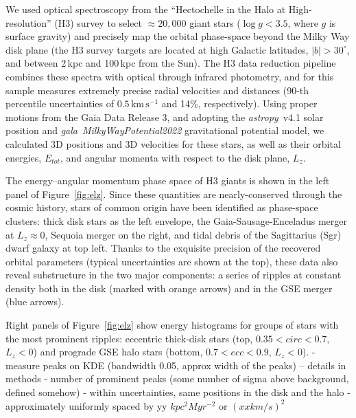 \documentclass{natureprintstyle}
\newcommand{\kms}{\ensuremath{\textrm{km}\,\textrm{s}^{-1}}}
\newcommand{\package}[1]{\textsl{#1}}
\begin{document}
We used optical spectroscopy from the ``Hectochelle in the Halo at High-resolution'' (H3) survey\cite{conroy:2019} to select $\approx20,000$ giant stars ($\log g<3.5$, where $g$ is surface gravity) and precisely map the orbital phase-space beyond the Milky Way disk plane (the H3 survey targets are located at high Galactic latitudes, $|b|>30^\circ$, and between 2\,kpc and 100\,kpc from the Sun).
The H3 data reduction pipeline\cite{cargile:2020} combines these spectra with optical through infrared photometry, and for this sample measures extremely precise radial velocities and distances (90-th percentile uncertainties of $0.5\,\kms$ and 14\%, respectively).
Using proper motions from the Gaia Data Release 3\cite{gaiaedr3}, and adopting the \package{astropy}~v4.1 solar position\cite{astropy:2022} and \package{gala}~\package{MilkyWayPotential2022} gravitational potential model\cite{gala}, we calculated 3D positions and 3D velocities for these stars, as well as their orbital energies, $E_{tot}$, and angular momenta with respect to the disk plane, $L_z$.

The energy--angular momentum phase space of H3 giants is shown in the left panel of Figure~\ref{fig:elz}.
Since these quantities are nearly-conserved through the cosmic history, stars of common origin have been identified as phase-space clusters: thick disk stars as the left envelope, the Gaia-Sausage-Enceladus merger\cite{belokurov:2018,helmi:2018} at $L_z\approx0$, Sequoia merger\cite{myeong:2019,naidu:2020} on the right, and tidal debris of the Sagittarius (Sgr) dwarf galaxy\cite{ibata:2001,johnson:2020} at top left.
Thanks to the exquisite precision of the recovered orbital parameters (typical uncertainties are shown at the top), these data also reveal substructure in the two major components: a series of ripples at constant density both in the disk (marked with orange arrows) and in the GSE merger (blue arrows).

Right panels of Figure~\ref{fig:elz} show energy histograms for groups of stars with the most prominent ripples: eccentric thick-disk stars (top, $0.35<circ<0.7$, $L_z<0$) and prograde GSE halo stars (bottom, $0.7<ecc<0.9$, $L_z<0$).
- measure peaks on KDE (bandwidth 0.05, approx width of the peaks) -- details in methods
- number of prominent peaks (some number of sigma above background, defined somehow)
- within uncertainties, same positions in the disk and the halo
- approximately uniformly spaced by yy $kpc^2 Myr^{-2}$ or $(xx km/s)^2$
\end{document}
